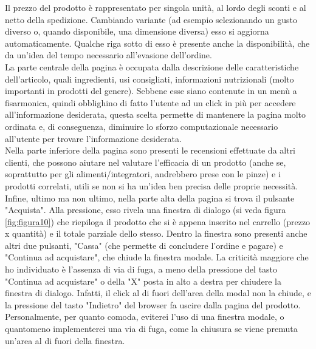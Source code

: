 Il prezzo del prodotto è rappresentato per singola unità, al lordo degli sconti e al netto della spedizione. Cambiando variante (ad esempio selezionando un gusto diverso o, quando disponibile, una dimensione diversa) esso si aggiorna automaticamente. Qualche riga sotto di esso è presente anche la disponibilità, che da un'idea del tempo necessario all'evasione dell'ordine.\\
La parte centrale della pagina è occupata dalla descrizione delle caratteristiche dell'articolo, quali ingredienti, usi consigliati, informazioni nutrizionali (molto importanti in prodotti del genere). Sebbene esse siano contenute in un menù a fisarmonica, quindi obblighino di fatto l'utente ad un click in più per accedere all'informazione desiderata, questa scelta permette di mantenere la pagina molto ordinata e, di conseguenza, diminuire lo sforzo computazionale necessario all'utente per trovare l'informazione desiderata.\\
Nella parte inferiore della pagina sono presenti le recensioni effettuate da altri clienti, che possono aiutare nel valutare l'efficacia di un prodotto (anche se, soprattutto per gli alimenti/integratori, andrebbero prese con le pinze) e i prodotti correlati, utili se non si ha un'idea ben precisa delle proprie necessità.\\
Infine, ultimo ma non ultimo, nella parte alta della pagina si trova il pulsante "Acquista". Alla pressione, esso rivela una finestra di dialogo (si veda figura \ref{fig:figura10}) che riepiloga il prodotto che si è appena inserito nel carrello (prezzo x quantità) e il totale parziale dello stesso. Dentro la finestra sono presenti anche altri due pulsanti, "Cassa" (che permette di concludere l'ordine e pagare) e "Continua ad acquistare", che chiude la finestra modale. La criticità maggiore che ho individuato è l'assenza di via di fuga, a meno della pressione del tasto "Continua ad acquistare" o della "X" posta in alto a destra per chiudere la finestra di dialogo. Infatti, il click al di fuori dell'area della modal non la chiude, e la pressione del tasto "Indietro" del browser fa uscire dalla pagina del prodotto. Personalmente, per quanto comoda, eviterei l'uso di una finestra modale, o quantomeno implementerei una via di fuga, come la chiusura se viene premuta un'area al di fuori della finestra.
